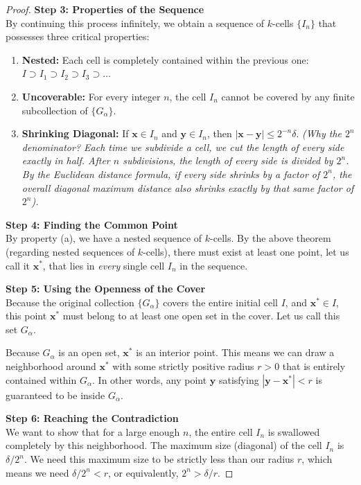 \documentclass{article}
\theoremstyle{mythm}
\begin{document}
\begin{proof}
\textbf{Step 3: Properties of the Sequence} \\
By continuing this process infinitely, we obtain a sequence of $k$-cells $\{I_n\}$ that possesses three critical properties:
\begin{enumerate}[label=(\alph*)]
    \item \textbf{Nested:} Each cell is completely contained within the previous one: $I \supset I_1 \supset I_2 \supset I_3 \supset \dots$
    \item \textbf{Uncoverable:} For every integer $n$, the cell $I_n$ cannot be covered by any finite subcollection of $\{G_\alpha\}$.
    \item \textbf{Shrinking Diagonal:} If $\mathbf{x} \in I_n$ and $\mathbf{y} \in I_n$, then $|\mathbf{x} - \mathbf{y}| \le 2^{-n}\delta$. 
    \textit{(Why the $2^n$ denominator? Each time we subdivide a cell, we cut the length of every side exactly in half. After $n$ subdivisions, the length of every side is divided by $2^n$. By the Euclidean distance formula, if every side shrinks by a factor of $2^n$, the overall diagonal maximum distance also shrinks exactly by that same factor of $2^n$).}
\end{enumerate}

\textbf{Step 4: Finding the Common Point} \\
By property (a), we have a nested sequence of $k$-cells. By the above theorem (regarding nested sequences of $k$-cells), there must exist at least one point, let us call it $\mathbf{x}^*$, that lies in \textit{every} single cell $I_n$ in the sequence. 

\textbf{Step 5: Using the Openness of the Cover} \\
Because the original collection $\{G_\alpha\}$ covers the entire initial cell $I$, and $\mathbf{x}^* \in I$, this point $\mathbf{x}^*$ must belong to at least one open set in the cover. Let us call this set $G_\alpha$.

Because $G_\alpha$ is an open set, $\mathbf{x}^*$ is an interior point. This means we can draw a neighborhood around $\mathbf{x}^*$ with some strictly positive radius $r > 0$ that is entirely contained within $G_\alpha$. In other words, any point $\mathbf{y}$ satisfying $|\mathbf{y} - \mathbf{x}^*| < r$ is guaranteed to be inside $G_\alpha$.

\textbf{Step 6: Reaching the Contradiction} \\
We want to show that for a large enough $n$, the entire cell $I_n$ is swallowed completely by this neighborhood. 
The maximum size (diagonal) of the cell $I_n$ is $\delta / 2^n$. We need this maximum size to be strictly less than our radius $r$, which means we need $\delta / 2^n < r$, or equivalently, $2^n > \delta / r$.


\end{proof}
\end{document}
